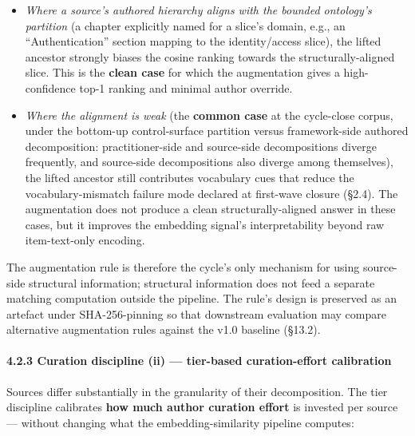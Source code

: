 \documentclass[
]{article}
\providecommand{\tightlist}{%
  \setlength{\itemsep}{0pt}\setlength{\parskip}{0pt}}
\begin{document}
\begin{itemize}
\tightlist
\item
  \emph{Where a source's authored hierarchy aligns with the bounded
  ontology's partition} (a chapter explicitly named for a slice's
  domain, e.g., an ``Authentication'' section mapping to the
  identity/access slice), the lifted ancestor strongly biases the cosine
  ranking towards the structurally-aligned slice. This is the
  \textbf{clean case} for which the augmentation gives a high-confidence
  top-1 ranking and minimal author override.
\item
  \emph{Where the alignment is weak} (the \textbf{common case} at the
  cycle-close corpus, under the bottom-up control-surface partition
  versus framework-side authored decomposition: practitioner-side and
  source-side decompositions diverge frequently, and source-side
  decompositions also diverge among themselves), the lifted ancestor
  still contributes vocabulary cues that reduce the vocabulary-mismatch
  failure mode declared at first-wave closure (§2.4). The augmentation
  does not produce a clean structurally-aligned answer in these cases,
  but it improves the embedding signal's interpretability beyond raw
  item-text-only encoding.
\end{itemize}

The augmentation rule is therefore the cycle's only mechanism for using
source-side structural information; structural information does not feed
a separate matching computation outside the pipeline. The rule's design
is preserved as an artefact under SHA-256-pinning so that downstream
evaluation may compare alternative augmentation rules against the v1.0
baseline (§13.2).

\paragraph{4.2.3 Curation discipline (ii) --- tier-based curation-effort
calibration}\label{curation-discipline-ii-tier-based-curation-effort-calibration}

Sources differ substantially in the granularity of their decomposition.
The tier discipline calibrates \textbf{how much author curation effort}
is invested per source --- without changing what the
embedding-similarity pipeline computes:
\end{document}
